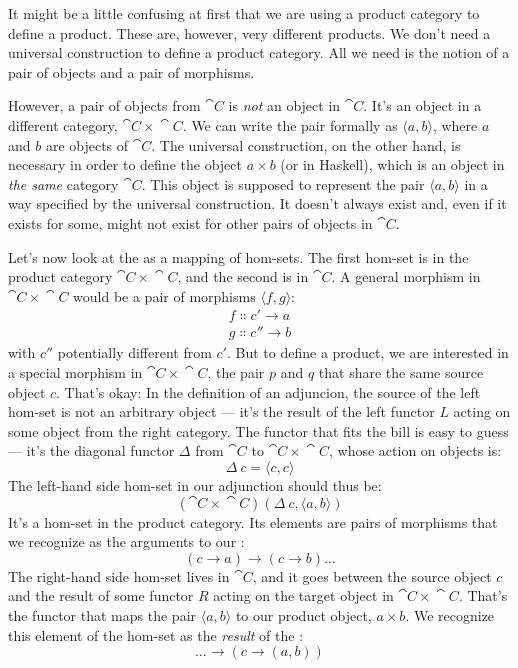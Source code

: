 \noindent
It might be a little confusing at first that we are using a product
category to define a product. These are, however, very different
products. We don't need a universal construction to define a product
category. All we need is the notion of a pair of objects and a pair of
morphisms.

However, a pair of objects from $\cat{C}$ is \emph{not} an object in
$\cat{C}$. It's an object in a different category, $\cat{C}\times{}\cat{C}$. We can
write the pair formally as $\langle a, b \rangle$,
where $a$ and $b$ are objects of $\cat{C}$. The universal
construction, on the other hand, is necessary in order to define the
object $a\times{}b$ (or  in Haskell), which is an object
in \emph{the same} category $\cat{C}$. This object is supposed to
represent the pair $\langle a, b \rangle$ in a way
specified by the universal construction. It doesn't always exist and,
even if it exists for some, might not exist for other pairs of objects
in $\cat{C}$.

Let's now look at the  as a mapping of hom-sets. The
first hom-set is in the product category $\cat{C}\times{}\cat{C}$, and the second is
in $\cat{C}$. A general morphism in $\cat{C}\times{}\cat{C}$ would be a pair of
morphisms $\langle f, g \rangle$:
\begin{gather*}
f \Colon c' \to a \\
g \Colon c'' \to b
\end{gather*}
with $c''$ potentially different from
$c'$. But to define a product, we are interested in a
special morphism in $\cat{C}\times{}\cat{C}$, the pair $p$ and $q$ that
share the same source object $c$. That's okay: In the definition
of an adjuncion, the source of the left hom-set is not an arbitrary
object --- it's the result of the left functor $L$ acting on some
object from the right category. The functor that fits the bill is easy
to guess --- it's the diagonal functor $\Delta$ from $\cat{C}$ to $\cat{C}\times{}\cat{C}$,
whose action on objects is:
\[\Delta\ c = \langle c, c \rangle\]
The left-hand side hom-set in our adjunction should thus be:
\[(\cat{C}\times{}\cat{C})(\Delta\ c, \langle a, b \rangle)\]
It's a hom-set in the product category. Its elements are pairs of
morphisms that we recognize as the arguments to our :
\[(c \to a) \to (c \to b) \ldots{}\]
The right-hand side hom-set lives in $\cat{C}$, and it goes between the
source object $c$ and the result of some functor $R$
acting on the target object in $\cat{C}\times{}\cat{C}$. That's the functor that maps
the pair $\langle a, b \rangle$ to our product object,
$a\times{}b$. We recognize this element of the hom-set as the
\emph{result} of the :
\[\ldots{} \to (c \to (a, b))\]

